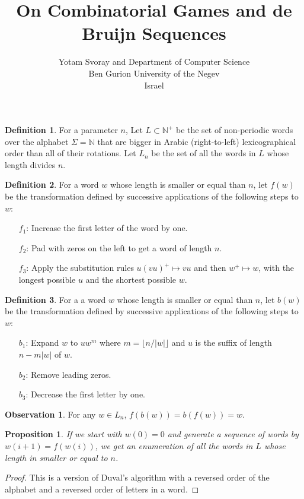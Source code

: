 \documentclass{article}
\title{On Combinatorial Games and de Bruijn Sequences}
\author{Yotam Svoray and %
	Department of Computer Science \\
	Ben Gurion University of the Negev\\
	Israel
}
\newtheorem{proposition}[theorem]{Proposition}
\theoremstyle{definition}
\newtheorem{definition}{Definition}
\newtheorem{observation}[theorem]{Observation}
\newcommand{\N}{{\mathbb{N}}}
\begin{document}
	
	
	
\begin{definition}
For a parameter $n$, Let $L \subset \N^+$ be the set of non-periodic words over the alphabet $\Sigma=\N$ that are bigger in Arabic (right-to-left) lexicographical order than all of their rotations. Let $L_n$ be the set of all the words in $L$ whose length divides $n$.
\end{definition}

\begin{definition}\label{forward}
For a word $w$ whose length is smaller or equal than $n$, let  $f(w)$ be the transformation defined by successive applications of the following steps to $w$:
\begin{enumerate}
	\item[$f_1$:] Increase the first letter of the word by one. 
	\item[$f_2$:] Pad with zeros on the left to get a word of length $n$.
	\item[$f_3$:] Apply the substitution rules $u(vu)^+ \mapsto vu$ and then $w^+ \mapsto w$, with the longest possible $u$ and the shortest possible $w$.
\end{enumerate}
\end{definition}

\begin{definition}\label{backward}
For a a word $w$ whose length is smaller or equal than $n$, let  $b(w)$ be the transformation defined by successive applications of the following steps to $w$:
\begin{enumerate}
	\item[$b_1$:] Expand $w$ to $u w^m$ where $m=\lfloor n/ |w| \rfloor$ and $u$ is the suffix of length $n-m|w|$ of $w$.
	
	\item[$b_2$:] Remove leading zeros.
	\item[$b_3$:] Decrease the first letter by one.
\end{enumerate}
\end{definition}

\begin{observation}
	For any $w\in L_n$, $f(b(w))=b(f(w))=w$.
\end{observation}



\begin{proposition}
	If we start with $w(0)=0$ and generate a sequence of words by $w({i+1})=f(w(i))$, we get an enumeration of all the words in $L$ whose length in smaller or equal to $n$.
\end{proposition}
\begin{proof}
	This is a version of Duval's algorithm with a reversed order of the alphabet and a reversed order of letters in a word.
\end{proof}
\end{document}
